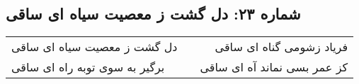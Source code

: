 \begin{center}
\section*{شماره ۲۳: دل گشت ز معصیت سیاه ای ساقی}
\label{sec:023}
\begin{longtable}{l p{0.5cm} r}
دل گشت ز معصیت سیاه ای ساقی
&&
فریاد زشومی گناه ای ساقی
\\
برگیر به سوی توبه راه ای ساقی
&&
کز عمر بسی نماند آه ای ساقی
\\
\end{longtable}
\end{center}
